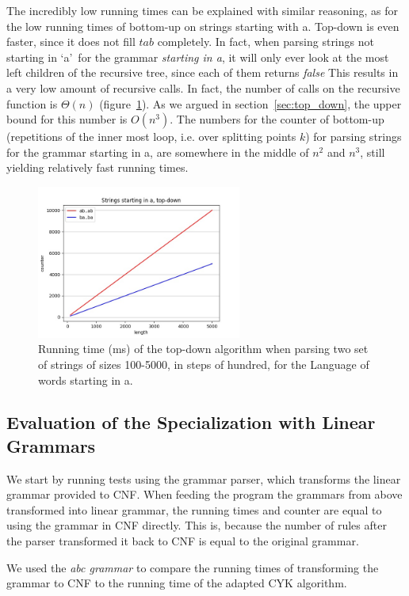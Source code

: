 The incredibly low running times can be explained with similar reasoning, as for the low running times of bottom-up on strings starting with a.
Top-down is even faster, since it does not fill $tab$ completely.
In fact, when parsing strings not starting in \lq a\rq~for the grammar \textit{starting in a}, it will only ever look at the most left children of the recursive tree, since each of them returns \textit{false}
This results in a very low amount of recursive calls.
In fact, the number of calls on the recursive function is $\Theta(n)$ (figure~\ref{fig:c_sa_td}).
As we argued in section~\ref{sec:top_down}, the upper bound for this number is $O(n^3)$.
The numbers for the counter of bottom-up (repetitions of the inner most loop, i.e. over splitting points $k$) for parsing strings for the grammar starting in a, are somewhere in the middle of $n^2$ and $n^3$, still yielding relatively fast running times.

\begin{figure}[h!]
    \centering
    \includegraphics[width=0.6\textwidth]{Resources/c_sa_td.jpg}
    \caption{Running time (ms) of the top-down algorithm when parsing two set of strings of sizes 100-5000, in steps of hundred, for the Language of words starting in a.}
    \label{fig:c_sa_td}
\end{figure}



\subsection{Evaluation of the Specialization with Linear Grammars}
We start by running tests using the grammar parser, which transforms the linear grammar provided to CNF.
When feeding the program the grammars from above transformed into linear grammar, the running times and counter are equal to using the grammar in CNF directly.
This is, because the number of rules after the parser transformed it back to CNF is equal to the original grammar.

We used the \textit{abc grammar} to compare the running times of transforming the grammar to CNF to the running time of the adapted CYK algorithm.



